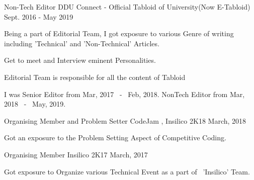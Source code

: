 


\begin{cventries}


\cventry
{Non-Tech Editor} %
{DDU Connect - Official Tabloid of University(Now E-Tabloid)} %
{Sept. 2016 - May 2019} %
{} %
{ %
\begin{cvitems}
\item {Being a part of Editorial Team, I got exposure to various Genre of writing including 'Technical' and 'Non-Technical' Articles.}
\item {Get to meet and Interview eminent Personalities.}
\item {Editorial Team is responsible for all the content of Tabloid}
\item {I was Senior Editor from Mar, 2017 ~-~ Feb, 2018. NonTech Editor from Mar, 2018 ~-~ May, 2019.}
\end{cvitems}
}


\cventry
{Organising Member and Problem Setter} %
{CodeJam , Insilico 2K18} %
{March, 2018} %
{} %
{ %
\begin{cvitems}
\item {Got an exposure to the Problem Setting Aspect of Competitive Coding.}
\end{cvitems}
}


\cventry
{Organising Member} %
{Insilico 2K17} %
{March, 2017} %
{} %
{ %
\begin{cvitems}
\item {Got exposure to Organize various Technical Event as a part of ~'Insilico' Team.}
\end{cvitems}
}




\end{cventries}